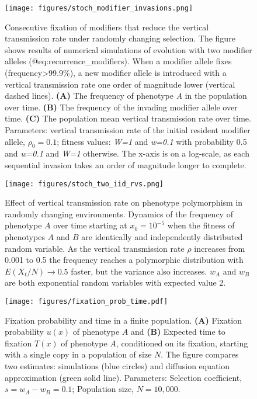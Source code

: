 \begin{figure}
\centering
\texttt{[image: figures/stoch\_modifier\_invasions.png]}
\caption{Consecutive fixation of modifiers that reduce the vertical
transmission rate under randomly changing selection. The figure shows
results of numerical simulations of evolution with two modifier alleles
(@eq:recurrence\_modifiers). When a modifier allele fixes
(frequency\textgreater{}99.9\%), a new modifier allele is introduced
with a vertical transmission rate one order of magnitude lower (vertical
dashed lines). \textbf{(A)} The frequency of phenotype \emph{A} in the
population over time. \textbf{(B)} The frequency of the invading
modifier allele over time. \textbf{(C)} The population mean vertical
transmission rate over time. Parameters: vertical transmission rate of the initial
resident modifier allele, \(\rho_0 =0.1\); fitness values: \emph{W=1}
and \emph{w=0.1} with probability 0.5 and \emph{w=0.1} and \emph{W=1}
otherwise. The x-axis is on a log-scale, as each sequential invasion takes
an order of magnitude longer to
complete.}\label{fig:stoch_modifier_invasions}
\end{figure}

\begin{figure}
\centering
\texttt{[image: figures/stoch\_two\_iid\_rvs.png]}
\caption{Effect of vertical transmission rate on phenotype polymorphism
in randomly changing environments. Dynamics of the frequency of phenotype
\(A\) over time starting
at \(x_0=10^{-5}\) when the fitness of phenotypes \(A\) and \(B\) are
identically and independently distributed random variable. As the vertical transmission rate \(\rho\) increases
from 0.001 to 0.5 the frequency reaches a polymorphic distribution with \(E(X_t/N)\to0.5\) faster, but
the variance also increases. \(w_A\) and \(w_B\) are both exponential
random variables with expected value 2.}\label{fig:stoch_two_iid_rvs}
\end{figure}

\begin{figure}
\centering
\texttt{[image: figures/fixation\_prob\_time.pdf]}
\caption{Fixation probability and time in a finite population.
\textbf{(A)} Fixation probability \(u(x)\) of phenotype \(A\) and \textbf{(B)}
Expected time to fixation \(T(x)\) of phenotype \(A\), conditioned on its
fixation, starting with a single copy in a population of size \(N\). The
figure compares two estimates: simulations (blue circles) and diffusion
equation approximation (green solid line). Parameters: Selection coefficient, \(s=w_A-w_B=0.1\);
Population size, \(N=10,000\).}\label{fixation_prob_time}
\end{figure}
